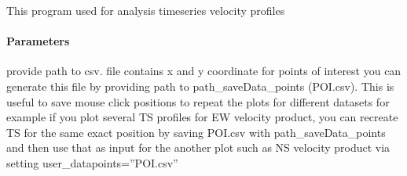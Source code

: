 \documentclass[letterpaper,10pt,english]{sphinxmanual}
\begin{document}
\begin{fulllineitems}
\label{\detokenize{akhdefo_functions:akhdefo_functions.AkhdefoPlot.akhdefo_ts_plot}}
\pysigstartsignatures
{}
\pysigstopsignatures
\sphinxAtStartPar
This program used for analysis time\sphinxhyphen{}series velocity profiles


\paragraph{Parameters}
\label{\detokenize{akhdefo_functions:id1}}\begin{description}
\sphinxAtStartPar
provide path to csv. file contains x and y coordinate for points of interest
you can generate this file by providing path to path\_saveData\_points (POI.csv).
This is useful to save mouse click positions to repeat the plots for different datasets for example if you plot several TS profiles for
EW velocity product, you can recreate TS for the same exact position by saving POI.csv with path\_saveData\_points and then use that as input for the another
plot such as NS velocity product via setting user\_datapoints=”POI.csv”


\end{description}
\end{fulllineitems}
\end{document}
